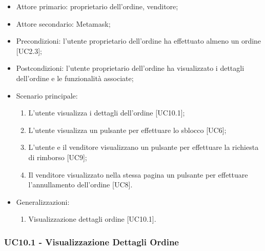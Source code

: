 \begin{itemize}
    \item Attore primario: proprietario dell'ordine, venditore;
    \item Attore secondario: Metamask\glo{};
    \item Precondizioni: l'utente proprietario dell'ordine ha effettuato almeno un ordine [UC2.3];
    \item Postcondizioni: l'utente proprietario dell'ordine ha visualizzato i dettagli dell'ordine e le funzionalità associate;
    \item Scenario principale:
        \begin{enumerate}
            \item L'utente visualizza i dettagli dell'ordine [UC10.1];
            \item L'utente visualizza un pulsante per effettuare lo sblocco [UC6];
            \item L'utente e il venditore visualizzano un pulsante per effettuare la richiesta di rimborso [UC9];
            \item Il venditore visualizzato nella stessa pagina un pulsante per effettuare l'annullamento dell'ordine [UC8].
        \end{enumerate}
    \item Generalizzazioni:
        \begin{enumerate}
            \item Visualizzazione dettagli ordine [UC10.1].
        \end{enumerate}
\end{itemize}

\subsubsection{UC10.1 - Visualizzazione Dettagli Ordine}

